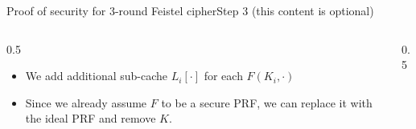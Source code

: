 \ifdefined\PRESENTATION\else\PassOptionsToClass{handout}{beamer}\fi\documentclass[aspectratio=169, lualatex]{beamer}
\begin{document}
	\begin{frame}{Proof of security for 3-round Feistel cipher}{Step 3 (this content is optional)}
		\begin{columns}[c]
			\begin{column}{0.5\textwidth}
				\begin{itemize}
					\item We add additional sub-cache $L_i[\cdot]$ for each $F(K_i,\cdot)$
					\item Since we already assume $F$ to be a secure PRF, we can replace it with the ideal PRF and remove $K$.
				\end{itemize}
			\end{column}
			\begin{column}{0.5\textwidth}
				\vspace{-1.5cm}
				\begin{center}
				\end{center}
			\end{column}
		\end{columns}
	\end{frame}
\end{document}
